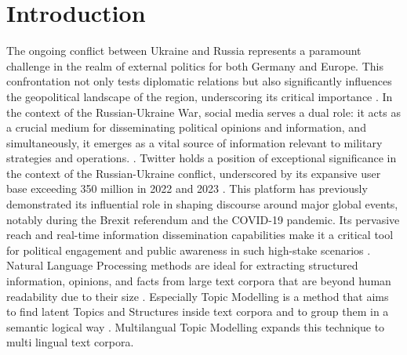 \documentclass[
    11pt,
    a4paper,
    egregdoesnotlikesansseriftitles,
    toc=chapterentrywithdots,
    oneside,openright,
    titlepage,
    parskip=half,
    headings=normal,  %
    listof=totoc,
    bibliography=totoc,
    index=totoc,
    captions=tableheading,  %
    chapterprefix,
    listof=flat,
    final
]{scrbook}
\begin{document}
\setcounter{secnumdepth}{3}  %
\setcounter{tocdepth}{2}  %

\frontmatter
{} 




\tableofcontents


{\let\clearpage\relax \chapter{Introduction}}
The ongoing conflict between Ukraine and Russia represents a paramount challenge in the realm of external politics for both Germany and Europe. This confrontation not only tests diplomatic relations but also significantly influences the geopolitical landscape of the region, underscoring its critical importance \cite{Zeitenwende}. In the context of the Russian-Ukraine War, social media serves a dual role: it acts as a crucial medium for disseminating political opinions and information, and simultaneously, it emerges as a vital source of information relevant to military strategies and operations. \cite{SocialMediaUkraine}.
Twitter holds a position of exceptional significance in the context of the Russian-Ukraine conflict, underscored by its expansive user base exceeding 350 million in 2022 and 2023 \cite{TwitterUsers}. This platform has previously demonstrated its influential role in shaping discourse around major global events, notably during the Brexit referendum and the COVID-19  pandemic. Its pervasive reach and real-time information dissemination capabilities make it a critical tool for political engagement and public awareness in such high-stake scenarios \cite{ TwitterBrexit, TwitterBrexit2, TwitterCovid, SocialNetworking}.
Natural Language Processing methods are ideal for extracting structured information, opinions, and facts from large text corpora that are beyond human readability due to their size \cite{Fraunhofer}.
Especially Topic Modelling is a method that aims to find latent Topics and Structures inside text corpora and to group them in a semantic logical way \cite{TopicModelling}.
Multilangual Topic Modelling expands this technique to multi lingual text corpora.
\end{document}
